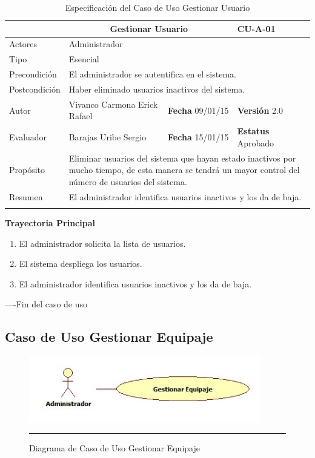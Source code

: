 \begin{longtable}{|p{2.5cm}|p{6.4cm}|p{2cm}|p{2cm}|}
	\hline
		\rowcolor[RGB]{51,153,255}{Caso de Uso}&\multicolumn{2}{c}{Gestionar Usuario}&{\textbf{CU-A-01}}\\
	\hline
		{Actores}&\multicolumn{3}{p{11.2cm}|}{Administrador}\\
	\hline
		{Tipo}&\multicolumn{3}{p{11.2cm}|}{Esencial}\\
	\hline
		{Precondición}&\multicolumn{3}{p{11.2cm}|}{El administrador se autentifica en el sistema.}\\
	\hline
		{Postcondición}&\multicolumn{3}{p{11.2cm}|}{Haber eliminado usuarios inactivos del sistema.}\\
	\hline
		{Autor}&{Vivanco Carmona Erick Rafael}&{\textbf{Fecha} 09/01/15}&{\textbf{Versión} 2.0}\\
			\hline
		{Evaluador}&{Barajas Uribe Sergio}&{\textbf{Fecha} 15/01/15}&{\textbf{Estatus} Aprobado}\\
	\hline
		{Propósito}&\multicolumn{3}{p{11.2cm}|}{Eliminar usuarios del sistema que hayan estado inactivos por mucho tiempo, de esta manera se tendrá un mayor control del número de usuarios del sistema.}\\
	\hline
		{Resumen}&\multicolumn{3}{p{11.2cm}|}{El administrador identifica usuarios inactivos y los da de baja.}\\	
	\hline
	\caption[Especificación del Caso de Uso Gestionar Usuario]{Especificación del Caso de Uso Gestionar Usuario}
    	\label{tab:cuGestionarUsuario}
\end{longtable}

\begin{flushleft}
	\textbf{Trayectoria Principal}\\
	\begin{enumerate}
		\item El administrador solicita la lista de usuarios.
		\item El sistema despliega los usuarios.
		\item El administrador identifica usuarios inactivos y los da de baja.
	\end{enumerate}
\end{flushleft}
----Fin del caso de uso

\subsection{Caso de Uso Gestionar Equipaje}

\begin{figure}[htbp]
	\centering
		\includegraphics[width=0.9\textwidth]{Figuras/cuGestionarEquipaje.jpg}
		\rule{30em}{0.5pt}
	\caption[Diagrama de Caso de Uso Gestionar Equipaje]{Diagrama de Caso de Uso Gestionar Equipaje}
	\label{fig:cuGestionarEquipaje}
\end{figure}

